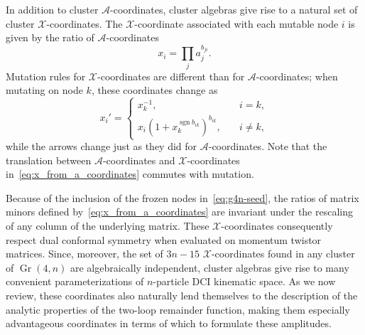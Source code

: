 \documentclass[11pt]{article}
\DeclareMathOperator{\Gr}{Gr}
\DeclareMathOperator{\sgn}{sgn}
\def\x{\mathcal{X}}
\def\xcoords{$\mathcal{X}$-coordinates }
\def\a{\mathcal{A}}
\begin{document}
In addition to cluster $\a$-coordinates, cluster algebras give rise to a natural set of cluster $\x$-coordinates. The $\x$-coordinate associated with each mutable node $i$ is given by the ratio of $\a$-coordinates
\begin{equation} \label{eq:x_from_a_coordinates}
	x_i = \prod_j a_j^{b_{ji}}. 	
\end{equation} 
Mutation rules for \xcoords are different than for $\a$-coordinates; when mutating on node $k$, these coordinates change as 
\begin{equation}
  \label{eq:x-coord-mutation}
  x_{i}' =
  \begin{cases}
    x_{k}^{-1}, &\quad i=k,\\
    x_{i} (1+x_{k}^{\sgn b_{i k}})^{b_{i k}}, &\quad i \neq k ,
  \end{cases}
\end{equation}
while the arrows change just as they did for $\a$-coordinates. Note that the translation between $\a$-coordinates and $\x$-coordinates in~\eqref{eq:x_from_a_coordinates} commutes with mutation. 

Because of the inclusion of the frozen nodes in~\eqref{eq:g4n-seed}, the ratios of matrix minors defined by~\eqref{eq:x_from_a_coordinates} are invariant under the rescaling of any column of the underlying matrix. These $\x$-coordinates consequently respect dual conformal symmetry when evaluated on momentum twistor matrices. Since, moreover, the set of $3n{-}15$ $\x$-coordinates found in any cluster of $\Gr(4,n)$ are algebraically independent, cluster algebras give rise to many convenient parameterizations of $n$-particle DCI kinematic space. As we now review, these coordinates also naturally lend themselves to the description of the analytic properties of the two-loop remainder function, making them especially advantageous coordinates in terms of which to formulate these amplitudes. 

\end{document}
